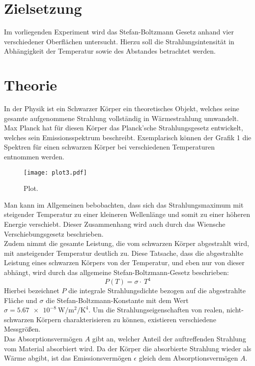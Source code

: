 \section{Zielsetzung}
Im vorliegenden Experiment wird das Stefan-Boltzmann Gesetz anhand vier verschiedener Oberflächen untersucht.
Hierzu soll die Strahlungsintensität in Abhängigkeit der Temperatur sowie des Abstandes betrachtet werden.

\section{Theorie}
\label{sec:Theorie}
In der Physik ist ein Schwarzer Körper ein theoretisches Objekt, welches seine gesamte aufgenommene Strahlung vollständig in Wärmestrahlung umwandelt.
Max Planck hat für diesen Körper das Planck'sche Strahlungsgesetz entwickelt, welches sein Emissionsspektrum beschreibt.
Exemplarisch können der Grafik 1 die Spektren für einen schwarzen Körper bei verschiedenen Temperaturen entnommen werden.
\begin{figure}[H]
  \centering
  \texttt{[image: plot3.pdf]}
  \caption{Plot.}
  \label{fig:plot}
\end{figure}
Man kann im Allgemeinen bebobachten, dass sich das Strahlungsmaximum mit steigender Temperatur zu einer kleineren Wellenlänge und somit zu einer höheren Energie verschiebt.
Dieser Zusammenhang wird auch durch das Wiensche Verschiebungsgesetz beschrieben.\\
Zudem nimmt die gesamte Leistung, die vom schwarzen Körper abgestrahlt wird, mit ansteigender Temperatur deutlich zu.
Diese Tatsache, dass die abgestrahlte Leistung eines schwarzen Körpers von der Temperatur, und eben nur von dieser abhängt, wird durch das allgemeine Stefan-Boltzmann-Gesetz beschrieben:
\begin{equation}
  P(T) = \sigma \cdot \ T^4
\end{equation}
Hierbei bezeichnet $P$ die integrale Strahlungsdichte bezogen auf die abgestrahlte Fläche und $\sigma$ die Stefan-Boltzmann-Konstante mit dem Wert $\sigma = \SI{5.67e-8}{\watt\per\metre\tothe{2}\per\kelvin\tothe{4}}$.
Um die Strahlungseigenschaften von realen, nicht-schwarzen Körpern charakterisieren zu können, existieren verschiedene Messgrößen.\\
Das Absorptionsvermögen $A$ gibt an, welcher Anteil der auftreffenden Strahlung vom Material absorbiert wird.
Da der Körper die absorbierte Strahlung wieder als Wärme abgibt, ist das Emissionsvermögen $\epsilon$ gleich dem Absorptionsvermögen $A$.
